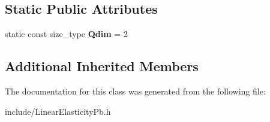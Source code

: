 \subsection*{Static Public Attributes}
\begin{DoxyCompactItemize}
\item 
\mbox{\label{classLinearElasticityPb_a81612404c74ed25325041b3b27139529}} 
static const size\+\_\+type {\bfseries Qdim} = 2
\end{DoxyCompactItemize}
\subsection*{Additional Inherited Members}


The documentation for this class was generated from the following file\+:\begin{DoxyCompactItemize}
\item 
include/Linear\+Elasticity\+Pb.\+h\end{DoxyCompactItemize}
